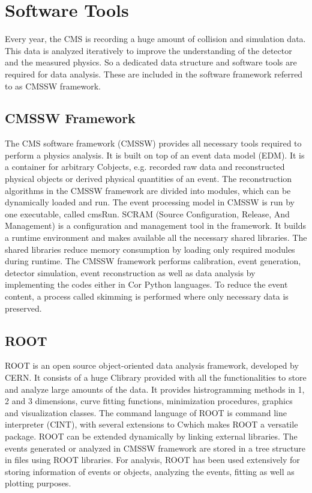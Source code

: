 \section{Software Tools}
Every year, the CMS is recording a huge amount of collision and simulation data. This data is analyzed iteratively to improve the understanding of the detector and the measured physics. So a dedicated data structure and software tools are required for data analysis. These are included in the software framework referred to as CMSSW framework.

\subsection{CMSSW Framework}
The CMS software framework (CMSSW) \cite{CMS:2005aa} provides all necessary tools required to perform a physics analysis. It is built on top of an event data model (EDM). It is a container for arbitrary C\plusn\plus objects, e.g. recorded raw data and reconstructed physical objects or derived physical quantities of an event. The reconstruction algorithms in the CMSSW framework are divided into modules, which can be dynamically loaded and run. The event processing model in CMSSW is run by one executable, called cmsRun. SCRAM (Source Configuration, Release, And Management) is a configuration and management tool in the framework. It builds a runtime environment and makes available all the necessary shared libraries. The shared libraries reduce memory consumption by loading only required modules during runtime. The CMSSW framework performs calibration, event generation, detector simulation, event reconstruction as well as data analysis by implementing the codes either in C\plusn\plus or Python languages. To reduce the event content, a process called skimming is performed where only necessary data is preserved. 

\subsection{ROOT}
ROOT \cite{Brun:1997pa} is an open source object-oriented data analysis framework, developed by CERN. It consists of a huge C\plusn\plus library provided with all the functionalities to store and analyze large amounts of the data. It provides histrogramming methods in 1, 2 and 3 dimensions, curve fitting functions, minimization procedures, graphics and visualization classes. The command language of ROOT is command line interpreter (CINT), with several extensions to C\plusn\plus which makes ROOT a versatile package. ROOT can be extended dynamically by linking external libraries. The events generated or analyzed in CMSSW framework are stored in a tree structure in files using ROOT libraries. For analysis, ROOT has been used extensively for storing information of events or objects, analyzing the events, fitting as well as plotting purposes.

